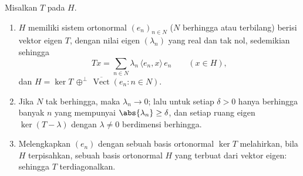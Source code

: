 \begin{theorem}\label{thm:b3:spectral:spectral}
Misalkan $T$   pada 
$H$.
\begin{enumerate}
  \item $H$ memiliki sistem ortonormal $(e_n)_{n \in N}$
        ($N$ berhingga atau terbilang) berisi vektor eigen $T$, dengan
        nilai eigen $(\lambda_n)$ yang real dan tak nol, sedemikian sehingga
        \[
        Tx = \sum_{n\in N}\lambda_n\,\langle e_n, x\rangle\,
        e_n \qquad (x \in H),
        \]
        dan $H = \ker T \,\oplus^\perp\,
        \overline{\operatorname{Vect}}(e_n : n \in N)$.
  \item Jika $N$ tak berhingga, maka $\lambda_n \to 0$; lalu untuk setiap
        $\delta > 0$ hanya berhingga banyak $n$ yang mempunyai
        $\abs{\lambda_n} \geq \delta$, dan setiap ruang eigen
        $\ker(T - \lambda)$ dengan $\lambda \neq 0$ berdimensi
        berhingga.
  \item Melengkapkan $(e_n)$ dengan sebuah basis ortonormal $\ker T$
        melahirkan, bila $H$ terpisahkan, sebuah basis ortonormal
        $H$ yang terbuat dari vektor eigen: sehingga $T$ terdiagonalkan.
\end{enumerate}
\end{theorem}

